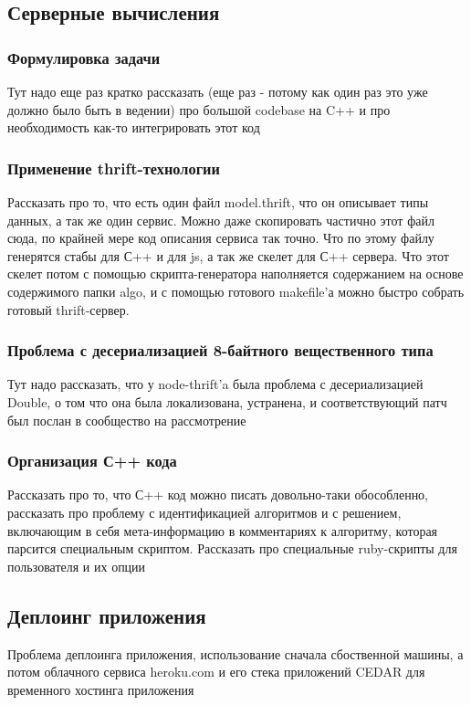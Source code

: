 \documentclass[12pt, a4paper]{article}
\begin{document}
\subsection{Серверные вычисления}
\subsubsection{Формулировка задачи}
Тут надо еще раз кратко рассказать (еще раз - потому как один раз это уже должно было
быть в ведении) про большой codebase на C++ и про необходимость как-то
интегрировать этот код
\subsubsection{Применение thrift-технологии}
Рассказать про то, что есть один файл model.thrift, что он описывает типы
данных, а так же один сервис. Можно даже скопировать частично этот файл сюда, по
крайней мере код описания сервиса так точно. Что по этому файлу генерятся стабы
для С++ и для js, а так же скелет для С++ сервера. Что этот скелет потом
с помощью скрипта-генератора наполняется содержанием на основе содержимого папки
algo, и с помощью готового makefile'а можно быстро собрать готовый
thrift-сервер.
\subsubsection{Проблема с десериализацией 8-байтного вещественного типа}
Тут надо рассказать, что у node-thrift'a была проблема с десериализацией Double,
о том что она была локализована, устранена, и соответствующий патч был послан в
сообщество на рассмотрение
\subsubsection{Организация С++ кода}
Рассказать про то, что С++ код можно писать довольно-таки обособленно,
рассказать про проблему с идентификацией алгоритмов и с решением, включающим в
себя мета-информацию в комментариях к алгоритму, которая парсится специальным
скриптом. Рассказать про специальные ruby-скрипты для пользователя и их опции

\subsection{Деплоинг приложения}
Проблема деплоинга приложения, использование сначала сбоственной машины, а потом
облачного сервиса heroku.com и его стека приложений CEDAR для временного
хостинга приложения
\end{document}
